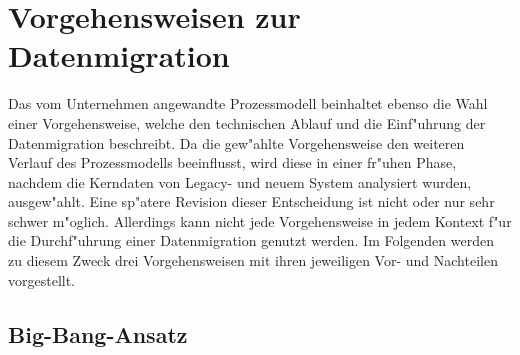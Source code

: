 \section{Vorgehensweisen zur Datenmigration}
\label{chapter:vorgehensweisen}


Das vom Unternehmen angewandte Prozessmodell beinhaltet ebenso die Wahl einer Vorgehensweise, welche den technischen Ablauf und die Einf"uhrung der Datenmigration beschreibt. Da die gew"ahlte Vorgehensweise den weiteren Verlauf des Prozessmodells beeinflusst, wird diese in einer fr"uhen Phase, nachdem die Kerndaten von Legacy- und neuem System analysiert wurden, ausgew"ahlt. Eine sp"atere Revision dieser Entscheidung ist nicht oder nur sehr schwer m"oglich. Allerdings kann nicht jede Vorgehensweise in jedem Kontext f"ur die Durchf"uhrung einer Datenmigration genutzt werden. Im Folgenden werden zu diesem Zweck drei Vorgehensweisen mit ihren jeweiligen Vor- und Nachteilen vorgestellt. 

\subsection{Big-Bang-Ansatz}

